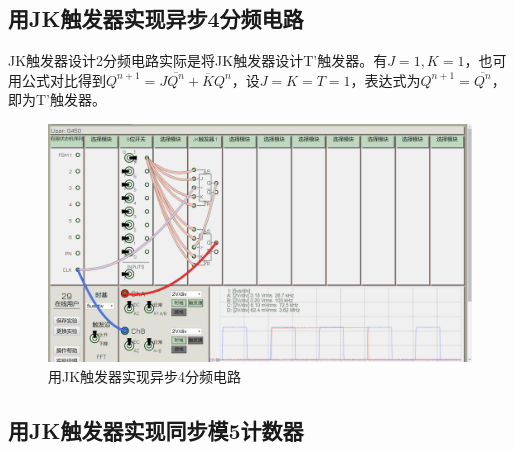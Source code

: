 \documentclass{ctexrep}
\begin{document}
\subsection{用JK触发器实现异步4分频电路}%
\label{sub:用JK触发器实现异步4分频电路}

JK触发器设计2分频电路实际是将JK触发器设计T'触发器。有$J=1,K=1$，也可用公式对比得到$Q^{n+1}=J\overline{Q^n}+\overline{K}Q^n$，设$J=K=T=1$，表达式为$Q^{n+1}=\overline{Q^n}$，即为T'触发器。

\begin{figure}[htbp]
	\centering
	\includegraphics[width=.7\linewidth]{24.png}
	\caption{用JK触发器实现异步4分频电路}
	\label{fig:用JK触发器实现异步4分频电路}
\end{figure}

\newpage
\subsection{用JK触发器实现同步模5计数器}%
\label{sub:用JK触发器实现同步模5计数器}
\end{document}
